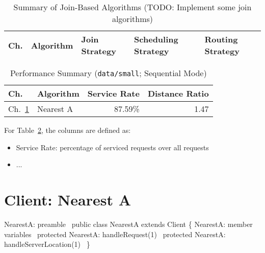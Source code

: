 \begin{table}[h]
\begin{center}
\caption{Summary of Join-Based Algorithms (TODO: Implement some join algorithms)}
\label{tab:join-algorithms}
\begin{tabular}{|l|l|l|l|l|}
\hline
Ch. & Algorithm & Join Strategy & Scheduling Strategy & Routing Strategy \\
\hline
\end{tabular}
\end{center}
\end{table}

\begin{table}[h]
\begin{center}
\caption{Performance Summary (\texttt{data/small}; Sequential Mode)}
\label{tab:performance-summary}
\begin{tabular}{|l|l|r|r|}
\hline
Ch. & Algorithm & Service Rate & Distance Ratio \\
\hline
Ch.~\ref{client-nearest-a} & Nearest A & 87.59\% & 1.47 \\
\hline
\end{tabular}
\end{center}
\end{table}

For Table~\ref{tab:performance-summary}, the columns are defined as:

\begin{itemize}
\item Service Rate: percentage of serviced requests over all requests
\item ...
\end{itemize}


\nwenddocs{}\chapter{Client: Nearest A}
\label{client-nearest-a}

\nwenddocs{}\endmoddef\nwstartdeflinemarkup\nwenddeflinemarkup
\LA{}NearestA: preamble~{\nwtagstyle{}}\RA{}
public class NearestA extends Client \{
  \LA{}NearestA: member variables~{\nwtagstyle{}}\RA{}
  protected \LA{}NearestA: handleRequest(1)~{\nwtagstyle{}}\RA{}
  protected \LA{}NearestA: handleServerLocation(1)~{\nwtagstyle{}}\RA{}
\}
\nwendcode{}\nwdocspar


